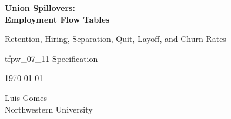 \documentclass[12pt,letterpaper]{article}
\begin{document}
\begin{titlepage}
\centering
\vspace*{2cm}
{\Huge\bfseries Union Spillovers:\\Employment Flow Tables\par}
\vspace{2cm}
{\Large Retention, Hiring, Separation, Quit, Layoff, and Churn Rates\par}
\vspace{0.5cm}
{\large tfpw\_07\_11 Specification\par}
\vspace{1cm}
{\large \today\par}
\vfill
{\large Luis Gomes\\Northwestern University\par}
\end{titlepage}

\tableofcontents
\clearpage
\end{document}
